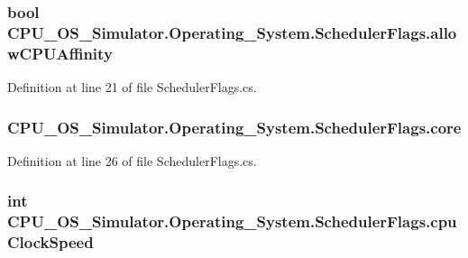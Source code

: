 \subsubsection[{allow\+C\+P\+U\+Affinity}]{\setlength{\rightskip}{0pt plus 5cm}bool C\+P\+U\+\_\+\+O\+S\+\_\+\+Simulator.\+Operating\+\_\+\+System.\+Scheduler\+Flags.\+allow\+C\+P\+U\+Affinity}\label{struct_c_p_u___o_s___simulator_1_1_operating___system_1_1_scheduler_flags_ad2d1f81a34e9cce1553bfdf8e8a719ea}


Definition at line 21 of file Scheduler\+Flags.\+cs.

\hypertarget{struct_c_p_u___o_s___simulator_1_1_operating___system_1_1_scheduler_flags_a8640b28c0b54ac561e0b6b3882763471}{}
\subsubsection[{core}]{ C\+P\+U\+\_\+\+O\+S\+\_\+\+Simulator.\+Operating\+\_\+\+System.\+Scheduler\+Flags.\+core}\label{struct_c_p_u___o_s___simulator_1_1_operating___system_1_1_scheduler_flags_a8640b28c0b54ac561e0b6b3882763471}


Definition at line 26 of file Scheduler\+Flags.\+cs.

\hypertarget{struct_c_p_u___o_s___simulator_1_1_operating___system_1_1_scheduler_flags_a3ce064f3abe5ac1762f0e7bbfab2eee5}{}
\subsubsection[{cpu\+Clock\+Speed}]{\setlength{\rightskip}{0pt plus 5cm}int C\+P\+U\+\_\+\+O\+S\+\_\+\+Simulator.\+Operating\+\_\+\+System.\+Scheduler\+Flags.\+cpu\+Clock\+Speed}\label{struct_c_p_u___o_s___simulator_1_1_operating___system_1_1_scheduler_flags_a3ce064f3abe5ac1762f0e7bbfab2eee5}


